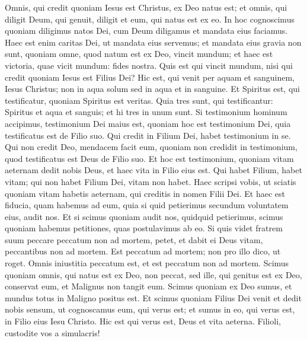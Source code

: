 \begin{biblechapter} 
\verse Omnis, qui credit quoniam Iesus est Christus, ex Deo natus est; et omnis, qui diligit Deum, qui genuit, diligit et eum, qui natus est ex eo. 
\verse In hoc cognoscimus quoniam diligimus natos Dei, cum Deum diligamus et mandata eius faciamus. 
\verse Haec est enim caritas Dei, ut mandata eius servemus; et mandata eius gravia non sunt,  
\verse quoniam omne, quod natum est ex Deo, vincit mundum; et haec est victoria, quae vicit mundum: fides nostra. 
\verse Quis est qui vincit mundum, nisi qui credit quoniam Iesus est Filius Dei?  
\verse Hic est, qui venit per aquam et sanguinem, Iesus Christus; non in aqua solum sed in aqua et in sanguine. Et Spiritus est, qui testificatur, quoniam Spiritus est veritas. 
\verse Quia tres sunt, qui testificantur: 
\verse Spiritus et aqua et sanguis; et hi tres in unum sunt. 
\verse Si testimonium hominum accipimus, testimonium Dei maius est, quoniam hoc est testimonium Dei, quia testificatus est de Filio suo. 
\verse Qui credit in Filium Dei, habet testimonium in se. Qui non credit Deo, mendacem facit eum, quoniam non credidit in testimonium, quod testificatus est Deus de Filio suo. 
\verse Et hoc est testimonium, quoniam vitam aeternam dedit nobis Deus, et haec vita in Filio eius est. 
\verse Qui habet Filium, habet vitam; qui non habet Filium Dei, vitam non habet. 
\verse Haec scripsi vobis, ut sciatis quoniam vitam habetis aeternam, qui creditis in nomen Filii Dei. 
\verse Et haec est fiducia, quam habemus ad eum, quia si quid petierimus secundum voluntatem eius, audit nos. 
\verse Et si scimus quoniam audit nos, quidquid petierimus, scimus quoniam habemus petitiones, quas postulavimus ab eo. 
\verse Si quis videt fratrem suum peccare peccatum non ad mortem, petet, et dabit ei Deus vitam, peccantibus non ad mortem. Est peccatum ad mortem; non pro illo dico, ut roget. 
\verse Omnis iniustitia peccatum est, et est peccatum non ad mortem. 
\verse Scimus quoniam omnis, qui natus est ex Deo, non peccat, sed ille, qui genitus est ex Deo, conservat eum, et Malignus non tangit eum. 
\verse Scimus quoniam ex Deo sumus, et mundus totus in Maligno positus est. 
\verse Et scimus quoniam Filius Dei venit et dedit nobis sensum, ut cognoscamus eum, qui verus est; et sumus in eo, qui verus est, in Filio eius Iesu Christo. Hic est qui verus est, Deus et vita aeterna. 
\verse Filioli, custodite vos a simulacris!    
\end{biblechapter}
